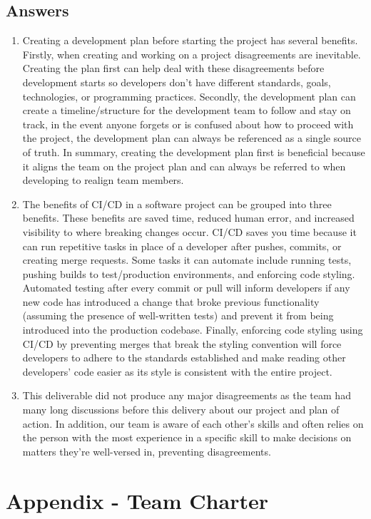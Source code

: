 \documentclass{article}
\begin{document}
\subsection*{Answers}
\begin{enumerate}
    \item Creating a development plan before starting the project has several benefits. Firstly, when creating and working on a project disagreements are inevitable. Creating the plan first can help deal with these disagreements before development starts so developers don’t have different standards, goals, technologies, or programming practices. Secondly, the development plan can create a timeline/structure for the development team to follow and stay on track, in the event anyone forgets or is confused about how to proceed with the project, the development plan can always be referenced as a single source of truth. In summary, creating the development plan first is beneficial because it aligns the team on the project plan and can always be referred to when developing to realign team members.
    \item The benefits of CI/CD in a software project can be grouped into three benefits. These benefits are saved time, reduced human error, and increased visibility to where breaking changes occur. CI/CD saves you time because it can run repetitive tasks in place of a developer after pushes, commits, or creating merge requests. Some tasks it can automate include running tests, pushing builds to test/production environments, and enforcing code styling. Automated testing after every commit or pull will inform developers if any new code has introduced a change that broke previous functionality (assuming the presence of well-written tests) and prevent it from being introduced into the production codebase. Finally, enforcing code styling using CI/CD by preventing merges that break the styling convention will force developers to adhere to the standards established and make reading other developers' code easier as its style is consistent with the entire project.
    \item This deliverable did not produce any major disagreements as the team had many long discussions before this delivery about our project and plan of action. In addition, our team is aware of each other's skills and often relies on the person with the most experience in a specific skill to make decisions on matters they're well-versed in, preventing disagreements.
\end{enumerate}
\newpage{}
\section*{Appendix - Team Charter}
\end{document}
